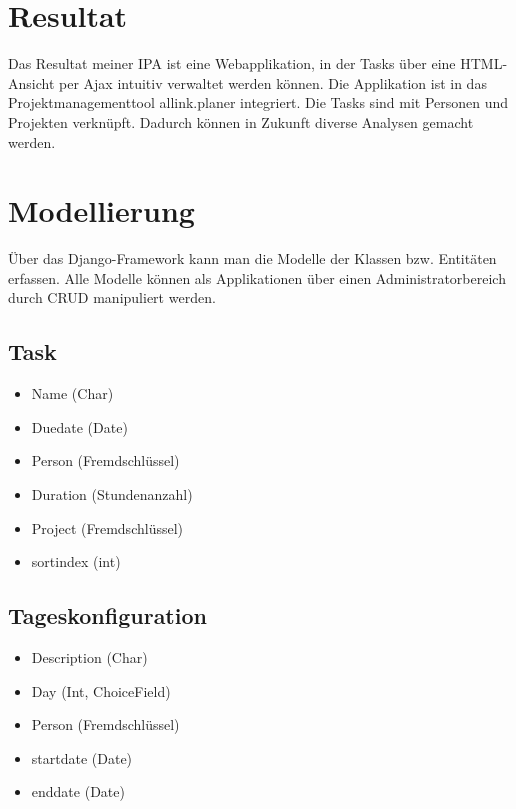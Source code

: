 \section{Resultat}
Das Resultat meiner IPA ist eine Webapplikation, in der Tasks über eine HTML-Ansicht per Ajax intuitiv verwaltet werden können. Die Applikation ist in das Projektmanagementtool allink.planer integriert.
Die Tasks sind mit Personen und Projekten verknüpft. Dadurch können in Zukunft diverse Analysen gemacht werden.
\section{Modellierung}
Über das Django-Framework kann man die Modelle der Klassen bzw. Entitäten erfassen.
Alle Modelle können als Applikationen über einen Administratorbereich durch CRUD manipuliert werden.
\subsection{Task}
\begin{itemize}
    \item Name (Char)
    \item Duedate (Date)
    \item Person (Fremdschlüssel)
    \item Duration (Stundenanzahl)
    \item Project (Fremdschlüssel)
    \item sortindex (int)
\end{itemize}
\subsection{Tageskonfiguration}
    \begin{itemize}
        \item Description (Char)
        \item Day (Int, ChoiceField)
        \item Person (Fremdschlüssel)
        \item startdate (Date)
        \item enddate (Date)
    \end{itemize}
